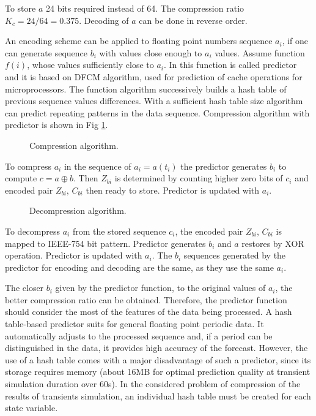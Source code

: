\documentclass[lettersize,journal]{IEEEtran}
\begin{document}
To store \(a\) 24 bits required instead of 64. The compression ratio \(K_c=24/64=0.375\). 
Decoding of \(a\) can be done in reverse order.

An encoding scheme can be applied to floating point numbers sequence \(a_i\), if one can generate sequence \(b_i\)
with values close enough to \(a_i\) values. Assume function \(f(i)\), whose values sufficiently close to \(a_i\).
In \cite{ratana06} this function is called predictor and it is based on DFCM algorithm, used for prediction of cache operations for microprocessors. The function algorithm successively builds a hash table of previous sequence values differences. 
With a sufficient hash table size algorithm can predict repeating patterns in the data sequence. Compression
algorithm with predictor is shown in Fig \ref{fig_compr}.

\begin{figure}[h]
	\centering
	\caption{Compression algorithm.}
	\label{fig_compr}
\end{figure}

To compress \(a_i\) in the sequence of \(a_i=a(t_i)\) the predictor generates \(b_i\) to compute 
\(c=a \oplus b \). 
Then \(Z_{bi}\) is determined by counting higher zero bits of \(c_i\) and encoded pair \(Z_{bi}\), \(C_{bi}\) then ready to store.
Predictor is updated with \(a_i\).

\begin{figure}[h]
	\centering
	\caption{Decompression algorithm.}
	\label{fig_decompr}
\end{figure}

To decompress \(a_i\) from the stored sequence \(c_i\), the encoded pair \(Z_{bi}\), \(C_{bi}\) 
is mapped to IEEE-754 bit pattern. Predictor generates \(b_i\) and \(a\) restores by XOR operation.
Predictor is updated with \(a_i\). The \(b_i\) sequences generated by the predictor for encoding and decoding are the same, as they use the same \(a_i\).

The closer \(b_i\) given by the predictor function, to the original values of \(a_i\), the better compression ratio can be obtained. 
Therefore, the predictor function should consider the most of the features of the data being processed. 
A hash table-based predictor suits for general floating point periodic data. It automatically adjusts to the processed sequence and, if a period can be distinguished in the data, it provides high accuracy of the forecast. 
However, the use of a hash table comes with a major disadvantage of such a predictor, since 
its storage requires memory (about 16MB for optimal prediction quality at transient simulation duration over 60s). 
In the considered problem of compression of the results of transients simulation, an individual hash table must be created for each state variable.
\end{document}
